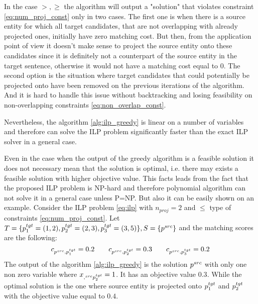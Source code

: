 In the case \( >, \geq \) the algorithm will output a "solution" that violates constraint
\eqref{eq:num_proj_const} only in two cases. The first one is when there is a source entity for which
all target candidates, that are not overlapping with already projected ones, initially have zero matching cost. But then,
from the application point of view it doesn't make sense to project the source entity onto these candidates
since it is definitely not a counterpart of the source entity in the target sentence, otherwise it would not
have a matching cost equal to \( 0 \). The second option is the situation where target candidates
that could potentially be projected onto have been removed on the previous iterations of the algorithm.
And it is hard to handle this issue without backtracking and losing feasibility on
non-overlapping constraints \eqref{eq:non_overlap_const}.

Nevertheless, the algorithm \ref{alg:ilp_greedy} is linear on a number of variables and therefore can
solve the ILP problem significantly faster than the exact ILP solver in a general case.

Even in the case when the output of the greedy algorithm is a feasible solution it does not
necessary mean that the solution is optimal, i.e. there may exists a feasible solution with higher objective
value. This facts leads from the fact that the proposed ILP problem is NP-hard and therefore polynomial
algorithm can not solve it in a general case unless P=NP. But also it can be easily shown on an example.
Consider the ILP problem \eqref{eq:ilp} with \( n_{proj} = 2 \) and \( \leq \) type of constraints \eqref{eq:num_proj_const}.
Let \( T = \{ p_1^{tgt} = (1, 2), p_2^{tgt} = (2, 3), p_3^{tgt} = (3, 5) \}, S = \{ p^{src} \} \) and
the matching scores are the following:
\[
    c_{p^{src}, p_1^{tgt}} = 0.2 \qquad
    c_{p^{src}, p_2^{tgt}} = 0.3 \qquad
    c_{p^{src}, p_3^{tgt}} = 0.2
\]
The output of the algorithm \ref{alg:ilp_greedy} is the solution \( p^{src} \) with only one
non zero variable where \( x_{,^{src} p_2^{tgt}} = 1 \). It has an objective value \( 0.3 \).
While the optimal solution is the one where source entity is projected onto \( p_1^{tgt} \) and
\( p_2^{tgt} \) with the objective value equal to \( 0.4 \).
